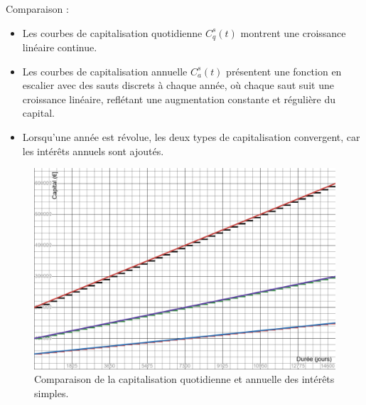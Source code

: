 \documentclass{article}
\begin{document}
\begin{enumerate}[label=\textbf{R1.\arabic*}]
          Comparaison :
          \begin{itemize}
              \item Les courbes de capitalisation quotidienne $C_q^s(t)$ montrent une croissance linéaire continue.
              \item Les courbes de capitalisation annuelle $C_a^s(t)$ présentent une fonction en escalier avec des sauts discrets à chaque année, où chaque saut suit une croissance linéaire, reflétant une augmentation constante et régulière du capital.
              \item Lorsqu'une année est révolue, les deux types de capitalisation convergent, car les intérêts annuels sont ajoutés.
          \end{itemize}
          
          \begin{figure}[h!]
              \centering
              \includegraphics[width=\textwidth]{interets_simples.png}
              \caption{Comparaison de la capitalisation quotidienne et annuelle des intérêts simples.}
              \label{fig:interets_simples}
          \end{figure}
          

\end{enumerate}
\end{document}
